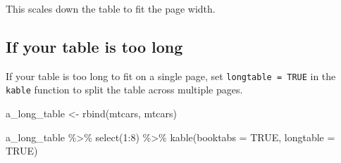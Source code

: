 \documentclass[a4paper, nobind]{templates/ociamthesis}
\newenvironment{Shaded}{\begin{snugshade}}{\end{snugshade}}
\newcommand{\AttributeTok}[1]{\textcolor[rgb]{0.77,0.63,0.00}{#1}}
\newcommand{\ConstantTok}[1]{\textcolor[rgb]{0.00,0.00,0.00}{#1}}
\newcommand{\DecValTok}[1]{\textcolor[rgb]{0.00,0.00,0.81}{#1}}
\newcommand{\FunctionTok}[1]{\textcolor[rgb]{0.00,0.00,0.00}{#1}}
\newcommand{\NormalTok}[1]{#1}
\newcommand{\OtherTok}[1]{\textcolor[rgb]{0.56,0.35,0.01}{#1}}
\newcommand{\SpecialCharTok}[1]{\textcolor[rgb]{0.00,0.00,0.00}{#1}}
\renewenvironment{Shaded}
{
  \vspace{10pt}%
  \begin{snugshade}%
}{%
  \end{snugshade}%
  \vspace{8pt}%
}
\begin{document}
\begin{table}
\centering
{}
\end{table}

This scales down the table to fit the page width.

\hypertarget{if-your-table-is-too-long}{%
\subsection{If your table is too long}\label{if-your-table-is-too-long}}

If your table is too long to fit on a single page, set \texttt{longtable\ =\ TRUE} in the \texttt{kable} function to split the table across multiple pages.

\begin{Shaded}
\begin{Highlighting}[]
\NormalTok{a\_long\_table }\OtherTok{\textless{}{-}} \FunctionTok{rbind}\NormalTok{(mtcars, mtcars)}

\NormalTok{a\_long\_table }\SpecialCharTok{\%\textgreater{}\%} 
  \FunctionTok{select}\NormalTok{(}\DecValTok{1}\SpecialCharTok{:}\DecValTok{8}\NormalTok{) }\SpecialCharTok{\%\textgreater{}\%} 
  \FunctionTok{kable}\NormalTok{(}\AttributeTok{booktabs =} \ConstantTok{TRUE}\NormalTok{, }\AttributeTok{longtable =} \ConstantTok{TRUE}\NormalTok{)}
\end{Highlighting}
\end{Shaded}
\end{document}

